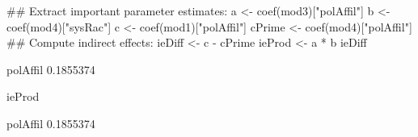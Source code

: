 \begin{Schunk}
\begin{Sinput}
 ## Extract important parameter estimates:
 a <- coef(mod3)["polAffil"]
 b <- coef(mod4)["sysRac"]
 c <- coef(mod1)["polAffil"]
 cPrime <- coef(mod4)["polAffil"]
 ## Compute indirect effects:
 ieDiff <- c - cPrime
 ieProd <- a * b
 ieDiff
\end{Sinput}
\begin{Soutput}
 polAffil 
0.1855374 
\end{Soutput}
\begin{Sinput}
 ieProd
\end{Sinput}
\begin{Soutput}
 polAffil 
0.1855374 
\end{Soutput}
\end{Schunk}
